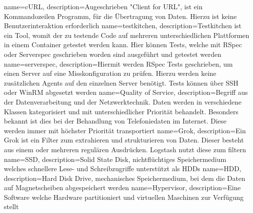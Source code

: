 {
  name=cURL,
  description={Augeschrieben "Client for URL", ist ein Kommandozeilen Programm,
               für die Übertragung von Daten. Hierzu ist keine
               Benutzerinteraktion erforderlich}
}
{
  name=testkitchen,
  description={Testkitchen ist ein Tool, womit der zu testende Code auf
              mehreren unterschiedlichen Plattformen in einem Container
              getestet werden kann. Hier können Tests, welche mit RSpec
              oder Serverspec geschrieben worden sind ausgeführt und
              getestet werden}
}
{
  name=serverspec,
  description={Hiermit werden RSpec Tests geschrieben, um einen Server
              auf eine Misskonfiguration zu prüfen. Hierzu werden keine
              zusätzlichen Agents auf den einzelnen Server benötigt. Tests
              können über SSH oder WinRM abgesetzt werden}
}
{
  name={Quality of Service},
  description={Begriff aus der Datenverarbeitung und der Netzwerktechnik. Daten
               werden in verschiedene Klassen kategorisiert und mit
               unterschiedlicher Priorität behandelt. Besonders bekannt ist
               dies bei der Behandlung von Telefoniedaten im Internet. Diese
               werden immer mit höchster Priorität transportiert}
}
{
  name=Grok,
  description={Ein Grok ist ein Filter zum extrahieren und strukturieren von
               Daten. Dieser besteht aus einem oder mehreren regulären
               Ausdrücken. Logstash nutzt diese zum filtern}
}
{
  name=SSD,
  description={Solid State Disk, nichtflüchtiges Speichermedium welches
               schnellere Lese- und Schreibzugriffe unterstützt als HDDs}
}
{
  name=HDD,
  description={Hard Disk Drive, mechanisches Speichermedium, bei dem die
               Daten auf Magnetscheiben abgespeichert werden}
}
{
  name=Hypervisor,
  description={Eine Software welche Hardware partitioniert und virtuellen
               Maschinen zur Verfügung stellt}
}